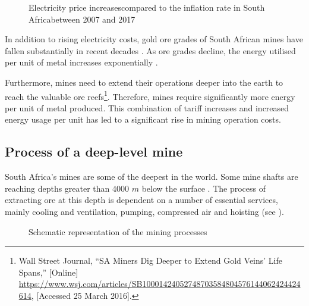 		\begin{figure}[h]
			\centering
			\fbox{}
			\caption[Electricity price increases compared to the inflation rate in South Africa]{Electricity price increases\protect\footnotemark[1] compared to the inflation rate in South Africa\protect\footnotemark[2] between 2007 and 2017}
			\label{fig: Eskom tariffs}
		\end{figure}
	
		\par
		In addition to rising electricity costs, gold ore grades of South African mines have fallen substantially in recent decades \cite{mudd2007global}. As ore grades decline, the energy utilised per unit of metal increases exponentially \cite{muller2010numerical}. 
		\par
		Furthermore, mines need to extend their operations deeper into the earth to reach the valuable ore reefs\footnote{Wall Street Journal, \enquote{SA Miners Dig Deeper to Extend Gold Veins' Life Spans,} [Online] \url{https://www.wsj.com/articles/SB10001424052748703584804576144062424424614}, [Accessed 25 March 2016].}. Therefore, mines require significantly more energy per unit of metal produced. This combination of tariff increases and increased energy usage per unit has led to a significant rise in mining operation costs.
	\subsection{Process of a deep-level mine}
	South Africa's mines are some of the deepest in the world. Some mine shafts are reaching depths greater than 4000 $m$ below the surface \cite{vosloo2012case}. The process of extracting ore at this depth is dependent on a number of essential services, mainly cooling and ventilation, pumping, compressed air and hoisting (see ).
	\par 
	\begin{figure}[h!]
		\centering
		\caption{Schematic representation of the mining processes}
		\label{fig: Mining Layout}
	\end{figure}
	

